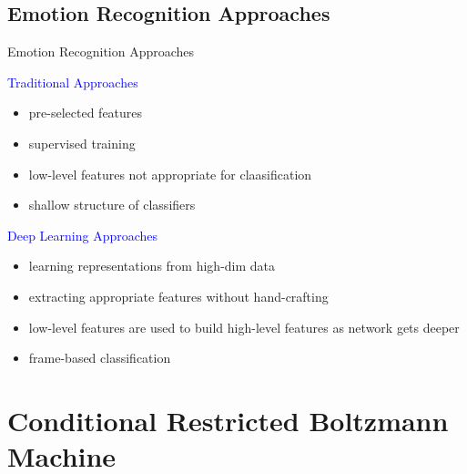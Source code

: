 \subsection{Emotion Recognition Approaches}

\begin{frame}[t]{Emotion Recognition Approaches}
	\begin{minipage}[t]{0.48\linewidth}
	  \textcolor{blue}{\Large Traditional Approaches}
	  \begin{itemize}
	   \item pre-selected features
	   \item supervised training
	   \item low-level features not appropriate for claasification
	   \item shallow structure of classifiers
	  \end{itemize}
	\end{minipage}\hfill
	\begin{minipage}[t]{0.48\linewidth}
	\textcolor{blue}{\Large Deep Learning Approaches}
	  \begin{itemize}
	   \item learning representations from high-dim data
	   \item extracting appropriate features without hand-crafting
	   \item low-level features are used to build high-level features as network gets deeper
	   \item frame-based classification
	  \end{itemize}

	\end{minipage}

\end{frame}


\section{Conditional Restricted Boltzmann Machine} %



